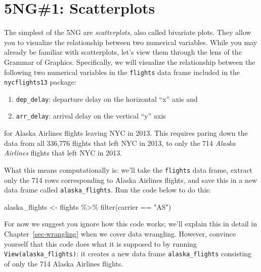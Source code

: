 \documentclass[
  letterpaper,
  DIV=11,
  numbers=noendperiod]{scrreprt}
\newenvironment{Shaded}{\begin{snugshade}}{\end{snugshade}}
\newcommand{\FunctionTok}[1]{\textcolor[rgb]{0.28,0.35,0.67}{#1}}
\newcommand{\NormalTok}[1]{\textcolor[rgb]{0.00,0.23,0.31}{#1}}
\newcommand{\OtherTok}[1]{\textcolor[rgb]{0.00,0.23,0.31}{#1}}
\newcommand{\SpecialCharTok}[1]{\textcolor[rgb]{0.37,0.37,0.37}{#1}}
\newcommand{\StringTok}[1]{\textcolor[rgb]{0.13,0.47,0.30}{#1}}
\providecommand{\tightlist}{%
  \setlength{\itemsep}{0pt}\setlength{\parskip}{0pt}}\usepackage{longtable,booktabs,array}
\theoremstyle{definition}
\theoremstyle{remark}
\begin{document}
\hypertarget{sec-scatterplots}{%
\section{5NG\#1: Scatterplots}\label{sec-scatterplots}}

The simplest of the 5NG are \emph{scatterplots}, also called bivariate
plots. They allow you to visualize the relationship between two
numerical variables. While you may already be familiar with
scatterplots, let's view them through the lens of the Grammar of
Graphics. Specifically, we will visualize the relationship between the
following two numerical variables in the \texttt{flights} data frame
included in the \texttt{nycflights13} package:

\begin{enumerate}
\def\labelenumi{\arabic{enumi}.}
\tightlist
\item
  \texttt{dep\_delay}: departure delay on the horizontal ``x'' axis and
\item
  \texttt{arr\_delay}: arrival delay on the vertical ``y'' axis
\end{enumerate}

for Alaska Airlines flights leaving NYC in 2013. This requires paring
down the data from all 336,776 flights that left NYC in 2013, to only
the 714 \emph{Alaska Airlines} flights that left NYC in 2013.

What this means computationally is: we'll take the \texttt{flights} data
frame, extract only the 714 rows corresponding to Alaska Airlines
flights, and save this in a new data frame called
\texttt{alaska\_flights}. Run the code below to do this:

\begin{Shaded}
\begin{Highlighting}[]
\NormalTok{alaska\_flights }\OtherTok{\textless{}{-}}\NormalTok{ flights }\SpecialCharTok{\%\textgreater{}\%} 
  \FunctionTok{filter}\NormalTok{(carrier }\SpecialCharTok{==} \StringTok{"AS"}\NormalTok{)}
\end{Highlighting}
\end{Shaded}

For now we suggest you ignore how this code works; we'll explain this in
detail in Chapter~\ref{sec-wrangling} when we cover data wrangling.
However, convince yourself that this code does what it is supposed to by
running \texttt{View(alaska\_flights)}: it creates a new data frame
\texttt{alaska\_flights} consisting of only the 714 Alaska Airlines
flights.
\end{document}
